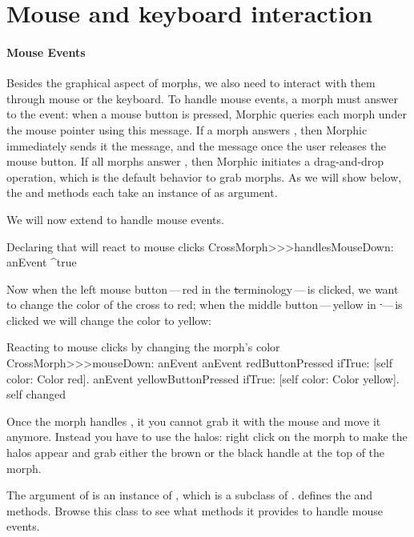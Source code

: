 \documentclass[a4paper,10pt,twoside]{book}
\begin{document}
\section{Mouse and keyboard interaction}

\paragraph{Mouse Events}
Besides the graphical aspect of morphs, we also need to interact with them through mouse or the keyboard.
To handle mouse events, a morph must answer  to the  event: when a mouse button is pressed, Morphic queries each morph under the mouse pointer using this message. If a morph answers , then Morphic immediately sends it the  message, and the  message once the user releases the mouse button.
If all morphs answer , then Morphic initiates a drag-and-drop operation, which is the default behavior to grab morphs.
As we will show below, the  and  methods each take an instance of  as argument.

We will now extend  to handle mouse events.

\begin{method}{Declaring that  will react to mouse clicks}
CrossMorph>>>handlesMouseDown: anEvent
   ^true
\end{method}

Now when the left mouse button\,---\,red in the \st terminology\,---\,is clicked, we want to change the color of the cross to red; when the middle button\,---\,yellow in \st\,---\,is clicked we will change the color to yellow:
\begin{method}{Reacting to mouse clicks by changing the morph's color}
CrossMorph>>>mouseDown: anEvent
   anEvent redButtonPressed
      ifTrue: [self color: Color red].
   anEvent yellowButtonPressed
      ifTrue: [self color: Color yellow].
   self changed
\end{method}

Once the morph handles , it you cannot grab it with the mouse and move it anymore. Instead you have to use the halos: right click on the morph to make the halos appear and grab either the brown or the black handle at the top of the morph.

The  argument of  is an instance of \mbox{,} which is a subclass of .  defines the  and  methods. Browse this class to see what methods it provides to handle mouse events.
\end{document}

